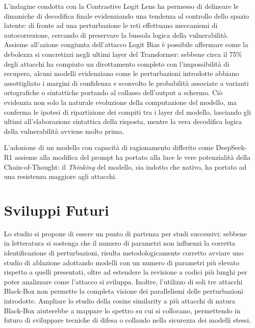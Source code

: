 L'indagine condotta con la Contrastive Logit Lens ha permesso di delineare le dinamiche di decodifica finale evidenziando una tendenza al controllo dello spazio latente: di fronte ad una perturbazione le reti effettuano meccanismi di autocorrezione, cercando di preservare la bussola logica della vulnerabilità. Assieme all'azione congiunta dell'attacco Logit Bias è possibile affermare come la debolezza si concretizzi negli ultimi layer del Transformer: sebbene circa il 75\% degli attacchi ha compiuto un dirottamento completo con l'impossibilità di recupero, alcuni modelli evidenziano come le perturbazioni introdotte abbiano assottigliato i margini di confidenza e sconvolto le probabilità associate a varianti ortografiche o sintattiche portando al collasso dell'output a schermo.
Ciò evidenzia non solo la naturale evoluzione della computazione del modello, ma conferma le ipotesi di ripartizione dei compiti tra i layer del modello, lasciando gli ultimi all'elaborazione sintattica della risposta, mentre la vera decodifica logica della vulnerabilità avviene molto prima.

L'adozione di un modello con capacità di ragionamento differito come DeepSeek-R1 assieme alla modifica del prompt ha portato alla luce le vere potenzialità della Chain-of-Thought: il \textit{Thinking} del modello, sia indotto che nativo, ha portato ad una resistenza maggiore agli attacchi.

\section{Sviluppi Futuri}
Lo studio si propone di essere un punto di partenza per studi successivi: sebbene in letteratura si sostenga che il numero di parametri non influenzi la corretta identificazione di perturbazioni, risulta metodologicamente corretto avviare uno studio di ablazione adottando modelli con un numero di parametri più elevato rispetto a quelli presentati, oltre ad estendere la revisione a codici più lunghi per poter analizzare come l'attacco si sviluppa.
Inoltre, l'utilizzo di soli tre attacchi Black-Box non permette la completa visione dei parallelismi delle perturbazioni introdotte. Ampliare lo studio della cosine similarity a più attacchi di natura Black-Box aiuterebbe a mappare lo spettro su cui si collocano, permettendo in futuro di sviluppare tecniche di difesa o collaudo nella sicurezza dei modelli stessi.